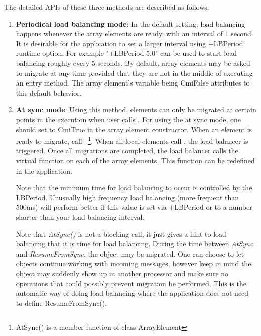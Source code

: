 The detailed APIs of these three methods are described as follows:
%
\begin{enumerate}
%
\item {\bf Periodical load balancing mode}: In the default setting, load
balancing happens whenever the array elements are ready, with an interval of 1
second. It is desirable for the application to set a larger interval using
+LBPeriod runtime option. For example "+LBPeriod 5.0" can be used to start load
balancing roughly every 5 seconds. By default, array elements may be asked to
migrate at any time provided that they are not in the middle of executing an
entry method. The array element's variable  being CmiFalse
attributes to this default behavior.
%
\item {\bf At sync mode}: Using this method, elements can only be migrated at
certain points in the execution when user calls . For using the at
sync mode, one should set  to CmiTrue in the array element
constructor.  When an element is ready to migrate, call
~\footnote{AtSync() is a member function of class ArrayElement}.
When all local elements call , the load balancer is triggered.  Once
all migrations are completed, the load balancer calls the virtual function
 on each of the array elements. This
function can be redefined in the application.

Note that the minimum time for  load balancing to occur
is controlled by the LBPeriod.  Unusually high frequency load
balancing (more frequent than 500ms) will perform better if this value
is set via +LBPeriod or  to a number shorter than your load
balancing interval.

Note that {\em AtSync()} is not a blocking call, it just gives a hint to load
balancing that it is time for load balancing. During the time between {\em
AtSync} and {\em ResumeFromSync}, the object may be migrated. One can choose
to let objects continue working with incoming messages, however keep in mind
the object may suddenly show up in another processor and make sure no
operations that could possibly prevent migration be performed. This is the automatic way of doing load balancing where the application does not need to define ResumeFromSync().


\end{enumerate}

